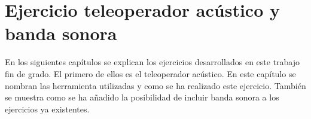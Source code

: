 \chapter{Ejercicio teleoperador acústico y banda sonora}\label{audio}
En los siguientes capítulos se explican los ejercicios desarrollados en este trabajo fin de grado. El primero de ellos es el teleoperador acústico. En este capítulo se nombran las herramienta utilizadas y como se ha realizado este ejercicio. También se muestra como se ha añadido la posibilidad de incluir banda sonora a los ejercicios ya existentes. 

